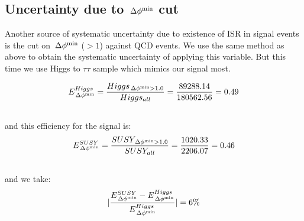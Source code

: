 





\subsection{\texorpdfstring{Uncertainty due to $\,{\Delta\phi^{\rm min}}$ cut}{Uncertainty due to minDeltaPhiJMET cut}}
Another source of systematic uncertainty due to existence of ISR in signal events is the cut on $\,{\Delta\phi^{\rm min}}$ ($ > 1$) against QCD events. We use the same method as above to obtain the systematic uncertainty of applying this variable. But this time we use Higgs to $\tau \tau$ sample which mimics our signal most.

\begin{align}
E^{Higgs}_{\,{\Delta\phi^{\rm min}}} &= \frac{Higgs_{\,{\Delta\phi^{\rm min}}>1.0}}{Higgs_{all}} = \frac{89288.14}{180562.56} = 0.49 \\ \nonumber
\end{align}
and this efficiency for the signal is: 
\begin{align}
E^{SUSY}_{\,{\Delta\phi^{\rm min}}} &= \frac{SUSY_{\,{\Delta\phi^{\rm min}}>1.0}}{SUSY_{all}} = \frac{1020.33}{2206.07} = 0.46 \\ \nonumber
\end{align}
and we take:
\begin{align}
|\frac{E^{SUSY}_{\,{\Delta\phi^{\rm min}}}-E^{Higgs}_{\,{\Delta\phi^{\rm min}}}}{E^{Higgs}_{\,{\Delta\phi^{\rm min}}}}| &= 6 \% \\ \nonumber
\end{align}

